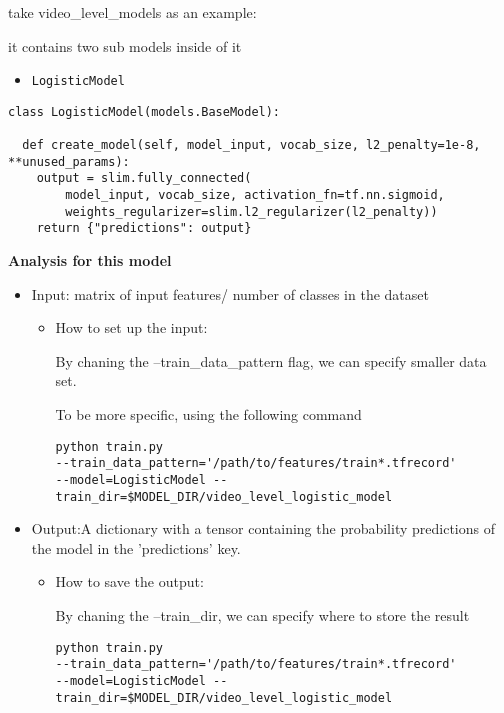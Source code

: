 \documentclass[11pt]{article}
\begin{document}
\begin{enumerate}
take video\_level\_models as an example:

it contains two sub models inside of it

\begin{itemize}
\item \texttt{LogisticModel}
\end{itemize}

\begin{verbatim}
class LogisticModel(models.BaseModel):

  def create_model(self, model_input, vocab_size, l2_penalty=1e-8,
**unused_params):
    output = slim.fully_connected(
        model_input, vocab_size, activation_fn=tf.nn.sigmoid,
        weights_regularizer=slim.l2_regularizer(l2_penalty))
    return {"predictions": output}
\end{verbatim}

\textbf{Analysis for this model}

\begin{itemize}
\item Input: matrix of input features/ number of classes in the dataset
\begin{itemize}
\item How to set up the input:

By chaning the --train\_data\_pattern flag, we can specify smaller data set. 

To be more specific, using the following command

\begin{verbatim}
python train.py
--train_data_pattern='/path/to/features/train*.tfrecord'
--model=LogisticModel --train_dir=$MODEL_DIR/video_level_logistic_model
\end{verbatim}
\end{itemize}
\end{itemize}


\begin{itemize}
\item Output:A dictionary with a tensor containing the probability predictions of the model in the 'predictions' key.
\begin{itemize}
\item How to save the output:

By chaning the --train\_dir, we can specify where to store the result
\begin{verbatim}
python train.py
--train_data_pattern='/path/to/features/train*.tfrecord'
--model=LogisticModel --train_dir=$MODEL_DIR/video_level_logistic_model
\end{verbatim}
\end{itemize}


\end{itemize}
\end{enumerate}
\end{document}
